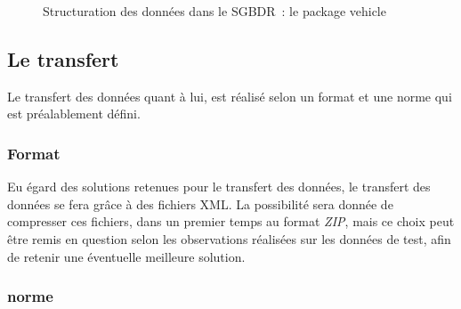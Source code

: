 \begin{figure}[htbp]
	\centering
	\caption{Structuration des données dans le SGBDR~: le package vehicle}
	\label{DonneesStructurationSgbdrVehicle}
\end{figure}

\subsection{Le transfert}
Le transfert des données quant à lui, est réalisé selon un format et une norme qui est préalablement défini.

\subsubsection{Format}
Eu égard des solutions retenues pour le transfert des données, le transfert des données se fera grâce à des fichiers XML.
La possibilité sera donnée de compresser ces fichiers, dans un premier temps au format \emph{ZIP}, mais ce choix peut être remis en question selon les observations réalisées sur les données de test, afin de retenir une éventuelle meilleure solution.

\subsubsection{norme}
% 
% 

